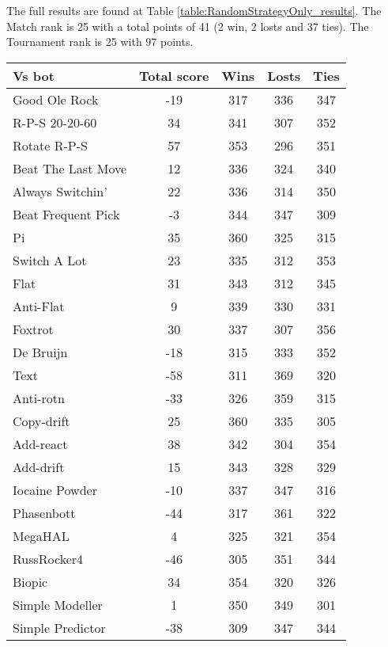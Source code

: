The full results are found at Table \ref{table:RandomStrategyOnly_results}. The Match rank is 25 with a total points of 41 (2 win, 2 losts and 37 ties). The Tournament rank is 25 with 97 points.

\begin{table*}
    \caption{RandomStrategyOnly results}
    \label{table:RandomStrategyOnly_results}
    \centering
    \begin{tabular}{|l|c|c|c|c|}
        \hline
        \textbf{Vs bot} & \textbf{Total score} & \textbf{Wins} & \textbf{Losts} & \textbf{Ties} \\ \hline
Good Ole Rock & -19 & 317 & 336 & 347 \\ \hline 
R-P-S 20-20-60 & 34 & 341 & 307 & 352 \\ \hline 
Rotate R-P-S & 57 & 353 & 296 & 351 \\ \hline 
Beat The Last Move & 12 & 336 & 324 & 340 \\ \hline 
Always Switchin' & 22 & 336 & 314 & 350 \\ \hline 
Beat Frequent Pick & -3 & 344 & 347 & 309 \\ \hline 
Pi & 35 & 360 & 325 & 315 \\ \hline 
Switch A Lot & 23 & 335 & 312 & 353 \\ \hline 
Flat & 31 & 343 & 312 & 345 \\ \hline 
Anti-Flat & 9 & 339 & 330 & 331 \\ \hline 
Foxtrot & 30 & 337 & 307 & 356 \\ \hline 
De Bruijn & -18 & 315 & 333 & 352 \\ \hline 
Text & -58 & 311 & 369 & 320 \\ \hline 
Anti-rotn & -33 & 326 & 359 & 315 \\ \hline 
Copy-drift & 25 & 360 & 335 & 305 \\ \hline 
Add-react & 38 & 342 & 304 & 354 \\ \hline 
Add-drift & 15 & 343 & 328 & 329 \\ \hline 
Iocaine Powder & -10 & 337 & 347 & 316 \\ \hline 
Phasenbott & -44 & 317 & 361 & 322 \\ \hline 
MegaHAL & 4 & 325 & 321 & 354 \\ \hline 
RussRocker4 & -46 & 305 & 351 & 344 \\ \hline 
Biopic & 34 & 354 & 320 & 326 \\ \hline 
Simple Modeller & 1 & 350 & 349 & 301 \\ \hline 
Simple Predictor & -38 & 309 & 347 & 344 \\ \hline 

\end{tabular}
\end{table*}
